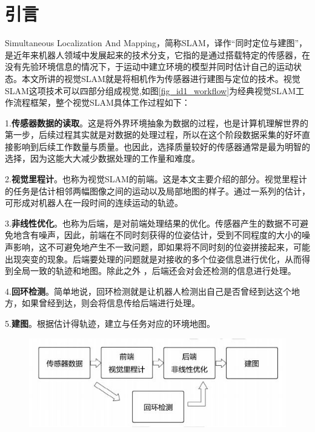 \documentclass[10.5pt,twocolumn]{jbuaa}
\begin{document}
\wuhao 



\section{引言}
Simultaneous Localization And Mapping，简称SLAM，译作“同时定位与建图”，是近年来机器人领域中发展起来的技术分支，它指的是通过搭载特定的传感器，在没有先验环境信息的情况下，于运动中建立环境的模型并同时估计自己的运动状态。本文所讲的视觉SLAM就是将相机作为传感器进行建图与定位的技术。视觉SLAM这项技术可以四部分组成视觉,如图\ref{fig_id1_workflow}为经典视觉SLAM工作流程框架，整个视觉SLAM具体工作过程如下：

1.\textbf{传感器数据的读取}。这是将外界环境抽象为数据的过程，也是计算机理解世界的第一步，后续过程其实就是对数据的处理过程，所以在这个阶段数据采集的好坏直接影响到后续工作数量与质量。也因此，选择质量较好的传感器通常是最为明智的选择，因为这能大大减少数据处理的工作量和难度。

2.\textbf{视觉里程计}。也称为视觉SLAM的前端。这是本文主要介绍的部分。视觉里程计的任务是估计相邻两幅图像之间的运动以及局部地图的样子。通过一系列的估计，可形成对机器人在一段时间的连续运动的轨迹。

3.\textbf{非线性优化}。也称为后端，是对前端处理结果的优化。传感器产生的数据不可避免地含有噪声，因此，前端在不同时刻获得的位姿估计，受到不同程度的大小的噪声影响，这不可避免地产生不一致问题，即如果将不同时刻的位姿拼接起来，可能出现突变的现象。后端要处理的问题就是对接收的多个位姿信息进行优化，从而得到全局一致的轨迹和地图。除此之外 ，后端还会对会还检测的信息进行处理。

4.\textbf{回环检测}。简单地说，回环检测就是让机器人检测出自己是否曾经到达这个地方，如果曾经到达，则会将信息传给后端进行处理。

5.\textbf{建图}。根据估计得轨迹，建立与任务对应的环境地图。

\begin{figure}[h!]
	\centering
	\includegraphics [scale=0.6,trim=0 0 0 0]{./image/SLAM_workflow}
\end{figure}
\end{document}
